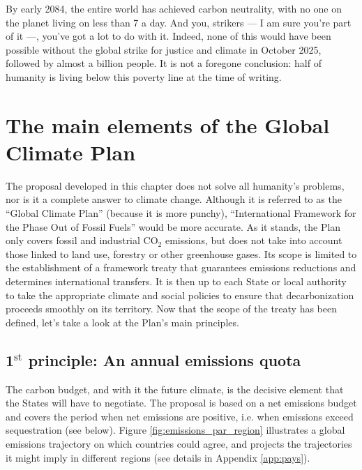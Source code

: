 \documentclass[a5paper,english,openany]{memoir}
\begin{document}
By early 2084,  the entire world has achieved carbon neutrality, with no one on the planet living on less than \textit{\texteuro{}}7 a day. %
And you, strikers --- I am sure you're part of it ---, you've got a lot to do with it. Indeed, none of this would have been possible without the global strike for justice and climate in October 2025, followed by almost a billion people.
It is not a foregone conclusion: half of humanity is living below this poverty line at the time of writing.

\chapter{The main elements of the Global Climate Plan\label{ch:principes}}

The proposal developed in this chapter does not solve all humanity's problems, nor is it a complete answer to climate change. Although it is referred to as the ``Global Climate Plan'' (because it is more punchy), ``International Framework for the Phase Out of Fossil Fuels'' would be %
more accurate.  %
As it stands, the Plan only covers fossil and industrial CO$_\text{2}$ emissions, but does not take into account %
those linked to land use, forestry or other greenhouse gases. %
Its scope is limited to the establishment of  %
a framework treaty that guarantees emissions reductions and determines international transfers. It is then up to each State or local authority to take the appropriate climate and social %
policies to ensure that decarbonization proceeds smoothly on its territory. Now that the scope of the treaty has been defined, %
let's take a look at the Plan's main principles.

\section*{1$^\text{st}$ principle: An annual emissions quota}\label{sec:pcp_quota}

The carbon budget, %
and with it the future climate, %
is the decisive element that the States will have to negotiate. 
The  %
proposal is based on a net emissions budget and covers the period when net emissions are positive, i.e. when emissions exceed sequestration (see below). Figure \ref{fig:emissions_par_region} illustrates a global emissions trajectory on which countries could agree, and projects the trajectories it might imply in different regions (see details in Appendix \ref{app:pays}). 
\end{document}
